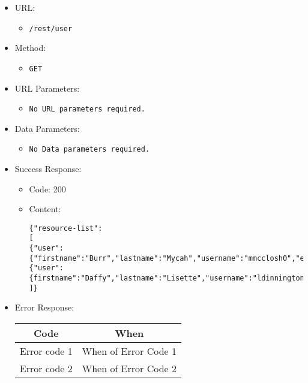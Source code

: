 \begin{itemize}

    \item URL: 
    \begin{itemize}
        \item \texttt{/rest/user}
    \end{itemize}
    
    \item Method: 
    \begin{itemize}
        \item \texttt{GET}
    \end{itemize}
    
    \item URL Parameters: 
    \begin{itemize}
        \item \texttt{No URL parameters required.}
    \end{itemize}
    
    \item Data Parameters: 
    \begin{itemize}
        \item \texttt{No Data parameters required.} 
    \end{itemize}
    
    \item Success Response: 
    \begin{itemize}
        \item Code: 200
        \item Content: 
        \begin{lstlisting}
{"resource-list":
[
{"user":{"firstname":"Burr","lastname":"Mycah","username":"mmcclosh0","email":"mchaudret0@dailymail.co.uk","telegram_chat_id":null}},
{"user":{firstname":"Daffy","lastname":"Lisette","username":"ldinningtont","email":"lgianettinit@wp.com","telegram_chat_id":null}}
]} 
        \end{lstlisting}    
    \end{itemize}
    
    \item Error Response:
    \begin{table}[!h]
    \centering 
    \begin{tabular}{|c|c|}
    \hline
    \multicolumn{1}{|c|}{\textbf{Code}} & \multicolumn{1}{c|}{\textbf{When}} \\ \hline
    Error code 1 & When of Error Code 1 \\\hline
    Error code 2 & When of Error Code 2 \\\hline
    \end{tabular} 
    \end{table} 

\end{itemize}


